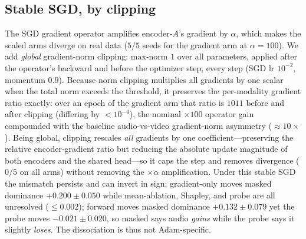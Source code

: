 \documentclass[conference]{IEEEtran}
\begin{document}
\subsection{Stable SGD, by clipping}
The SGD gradient operator amplifies encoder-$A$'s gradient by $\alpha$, which makes the scaled arms diverge on real data ($5/5$ seeds for the gradient arm at $\alpha{=}100$). We add \emph{global} gradient-norm clipping: max-norm $1$ over all parameters, applied after the operator's backward and before the optimizer step, every step (SGD lr $10^{-2}$, momentum $0.9$). Because norm clipping multiplies all gradients by one scalar when the total norm exceeds the threshold, it preserves the per-modality gradient ratio exactly: over an epoch of the gradient arm that ratio is $1011$ before and after clipping (differing by $<\!10^{-4}$), the nominal $\times100$ operator gain compounded with the baseline audio-vs-video gradient-norm asymmetry ($\approx\!10\times$). Being global, clipping rescales \emph{all} gradients by one coefficient---preserving the relative encoder-gradient ratio but reducing the absolute update magnitude of both encoders and the shared head---so it caps the step and removes divergence ($0/5$ on all arms) without removing the $\times\alpha$ amplification. Under this stable SGD the mismatch persists and can invert in sign: gradient-only moves masked dominance $+0.200\!\pm\!0.050$ while mean-ablation, Shapley, and probe are all unresolved ($\le0.002$); forward moves masked dominance $+0.132\!\pm\!0.079$ yet the probe moves $-0.021\!\pm\!0.020$, so masked says audio \emph{gains} while the probe says it slightly \emph{loses}. The dissociation is thus not Adam-specific.
\end{document}
